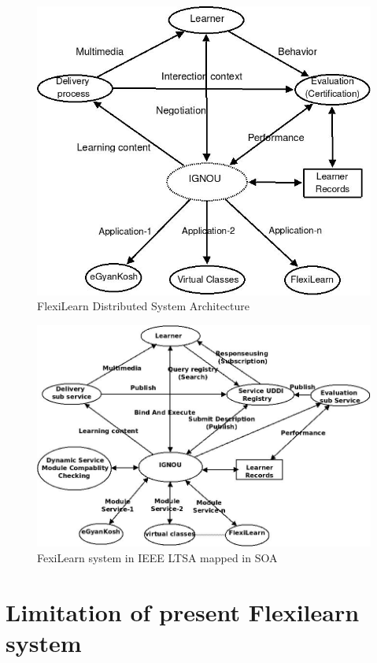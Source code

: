 \begin{figure}[htb]
 \centering
 \includegraphics[scale=.5]{flexi1.jpeg}
 \caption{FlexiLearn Distributed System Architecture}
\end{figure}
\begin{figure}[htb]
 \centering
 \includegraphics[scale=.5]{ignousoa2.jpeg}
 \caption{FexiLearn system in IEEE LTSA mapped in SOA}
\end{figure}

\section{Limitation of present Flexilearn system}
\blindtext
